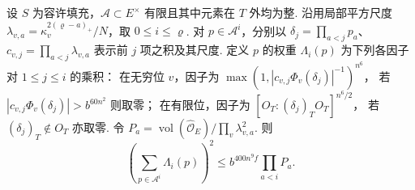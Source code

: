 \begin{lemma}
\label{lem:b-poisson-head-weights}
\emitthmsource
设 $S$ 为容许填充，$\mathcal A\subset E^\times$ 有限且其中元素在 $T$ 外均为整.
沿用局部平方尺度 $\lambda_{v,a}=\kappa_v^{2(\varrho-a)_+}/N$，取 $0\le i\le\varrho$.
对 $p\in\mathcal A^i$，分别以
$\delta_j=\prod_{a<j}p_a$、$c_{v,j}=\prod_{a<j}\lambda_{v,a}$ 表示前 $j$ 项之积及其尺度.
定义 $p$ 的权重 $\Lambda_i(p)$ 为下列各因子对 $1\le j\le i$ 的乘积：
在无穷位 $v$，因子为 $\max(1,|c_{v,j}\Phi_v(\delta_j)|^{-1})^{n^6}$，
若 $|c_{v,j}\Phi_v(\delta_j)|>b^{60n^2}$ 则取零；
在有限位，因子为 $[O_T:(\delta_j)_TO_T]^{n^6/2}$，
若 $(\delta_j)_T\notin O_T$ 亦取零.
令 $P_a=\operatorname{vol}(\widehat{\mathcal O}_E)/\prod_v\lambda_{v,a}^2$.
则
\[
 \left(\sum_{p\in\mathcal A^i}\Lambda_i(p)\right)^2
 \le b^{400n^9f}\prod_{a<i}P_a .
\]
\end{lemma}
